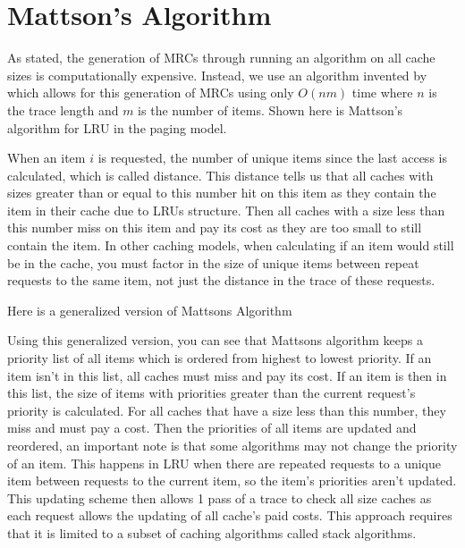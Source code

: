 \section{Mattson's Algorithm}

As stated, the generation of MRCs through running an algorithm on all cache sizes is computationally expensive. Instead, we use an algorithm invented by \cite{mattson1970evaluation} which allows for this generation of MRCs using only $O(nm)$ time where $n$ is the trace length and $m$ is the number of items. Shown here is Mattson's algorithm for LRU in the paging model.





When an item $i$ is requested, the number of unique items since the last access is calculated, which is called distance. This distance tells us that all caches with sizes greater than or equal to this number hit on this item as they contain the item in their cache due to LRUs structure. Then all caches with a size less than this number miss on this item and pay its cost as they are too small to still contain the item. In other caching models, when calculating if an item would still be in the cache, you must factor in the size of unique items between repeat requests to the same item, not just the distance in the trace of these requests. 

Here is a generalized version of Mattsons Algorithm
%



Using this generalized version, you can see that Mattsons algorithm keeps a priority list of all items which is ordered from highest to lowest priority. If an item isn't in this list, all caches must miss and pay its cost. If an item is then in this list, the size of items with priorities greater than the current request's priority is calculated. For all caches that have a size less than this number, they miss and must pay a cost. Then the priorities of all items are updated and reordered, an important note is that some algorithms may not change the priority of an item. This happens in LRU when there are repeated requests to a unique item between requests to the current item, so the item's priorities aren't updated.  
This updating scheme then allows 1 pass of a trace to check all size caches as each request allows the updating of all cache's paid costs. This approach requires that it is limited to a subset of caching algorithms called stack algorithms. 

